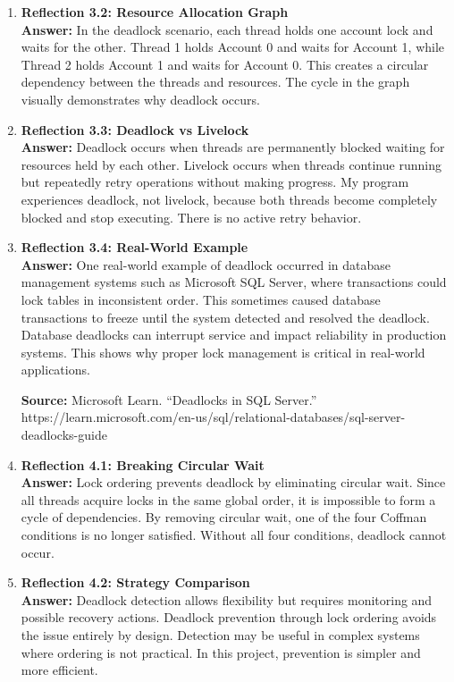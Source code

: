 \documentclass[12pt]{article}
\begin{document}
\begin{enumerate}
\item \textbf{Reflection 3.2: Resource Allocation Graph} \\
\textbf{Answer:} In the deadlock scenario, each thread holds one account lock and waits for the other. Thread 1 holds Account 0
 and waits for Account 1, while Thread 2 holds Account 1 and waits for Account 0. This creates a circular dependency between the threads
 and resources. The cycle in the graph visually demonstrates why deadlock occurs.

\item \textbf{Reflection 3.3: Deadlock vs Livelock} \\
\textbf{Answer:} Deadlock occurs when threads are permanently blocked waiting for resources held by each other. Livelock occurs when
 threads continue running but repeatedly retry operations without making progress. My program experiences deadlock, not livelock, because both
 threads become completely blocked and stop executing. There is no active retry behavior.

\item \textbf{Reflection 3.4: Real-World Example} \\
\textbf{Answer:} One real-world example of deadlock occurred in database management systems such as Microsoft SQL Server, where
 transactions could lock tables in inconsistent order. This sometimes caused database transactions to freeze until the system detected and
 resolved the deadlock. Database deadlocks can interrupt service and impact reliability in production systems. This shows why proper lock
 management is critical in real-world applications.

\textbf{Source:} Microsoft Learn. ``Deadlocks in SQL Server.''
https://learn.microsoft.com/en-us/sql/relational-databases/sql-server-deadlocks-guide

\item \textbf{Reflection 4.1: Breaking Circular Wait} \\
\textbf{Answer:} Lock ordering prevents deadlock by eliminating circular wait. Since all threads acquire locks in the same global
 order, it is impossible to form a cycle of dependencies. By removing circular wait, one of the four Coffman conditions is no longer satisfied.
 Without all four conditions, deadlock cannot occur.

\item \textbf{Reflection 4.2: Strategy Comparison} \\
\textbf{Answer:} Deadlock detection allows flexibility but requires monitoring and possible recovery actions. Deadlock prevention through
 lock ordering avoids the issue entirely by design. Detection may be useful in complex systems where ordering is not practical. In this project,
 prevention is simpler and more efficient.


\end{enumerate}
\end{document}
